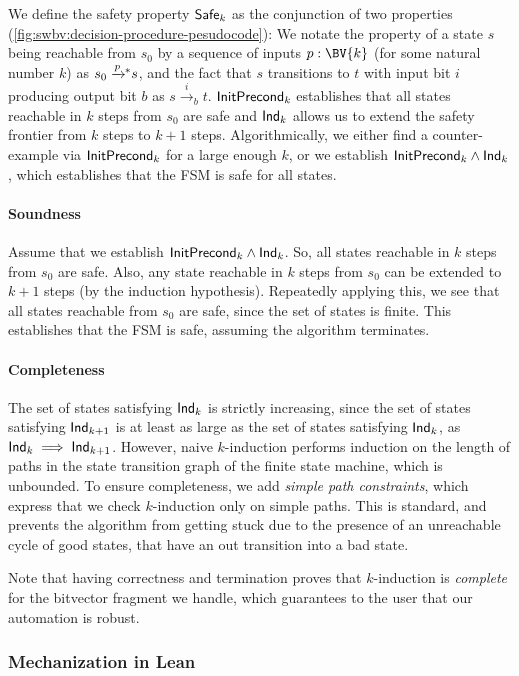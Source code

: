 We define the safety property $\mathsf{Safe}_k$ as the conjunction of two properties (\cref{fig:swbv:decision-procedure-pesudocode}):
We notate the property of a state $s$ being reachable from $s_0$ by a sequence of inputs $p : \BV{k}$ (for some natural number $k$) as $s_0 \xrightarrow{\footnotesize p}\!\!^* s$,
and the fact that $s$ transitions to $t$ with input bit $i$ producing output bit $b$ as $s \xrightarrow{i}_b t$.
$\mathsf{InitPrecond}_k$ establishes that all states reachable in $k$ steps from $s_0$ are safe
and $\mathsf{Ind}_k$ allows us to extend the safety frontier from $k$ steps to $k+1$ steps.
Algorithmically, we either find a counter-example via $\mathsf{InitPrecond}_k$ for a
large enough $k$, or we establish $\mathsf{InitPrecond}_k \land \mathsf{Ind}_k$, which establishes that the FSM is safe for all states.

\paragraph{Soundness}
Assume that we establish $\mathsf{InitPrecond}_k \land \mathsf{Ind}_k$.
So, all states reachable in $k$ steps from $s_0$ are safe.
Also, any state reachable in $k$ steps from $s_0$ can be extended to $k+1$ steps (by the induction hypothesis).
Repeatedly applying this, we see that all states reachable from $s_0$ are safe, since the set of states is finite.
This establishes that the FSM is safe, assuming the algorithm terminates.

\paragraph{Completeness}
The set of states satisfying $\mathsf{Ind}_k$ is strictly increasing, since the set of states satisfying $\mathsf{Ind}_{k+1}$ is at least as large as the set of states satisfying $\mathsf{Ind}_{k}$,
as $\mathsf{Ind}_{k} \implies \mathsf{Ind}_{k+1}$.
However, naive $k$-induction performs induction on the length of paths in the state transition graph of the finite state machine, which is unbounded.
To ensure completeness, we add \emph{simple path constraints},
which express that we check $k$-induction only on simple paths.
This is standard, and prevents the algorithm from getting stuck due to the presence of an unreachable
cycle of good states, that have an out transition into a bad state.

Note that having correctness and termination proves that $k$-induction is \emph{complete} for the bitvector fragment we handle, which guarantees to the user that our automation is robust.

\subsubsection{Mechanization in Lean}

